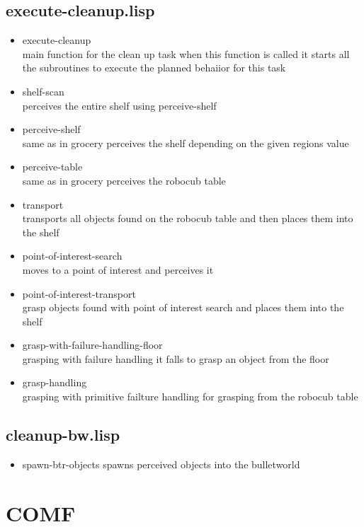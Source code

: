 \documentclass[main.tex]{subfiles}
\begin{document}
	  	\subsection{execute-cleanup.lisp}
	  	\begin{itemize}
			\item execute-cleanup \\
			main function for the clean up task when this function is called it starts all the subroutines to execute the planned behaiior for this task
			\item shelf-scan \\
			perceives the entire shelf using perceive-shelf
			\item perceive-shelf\\
			same as in grocery perceives the shelf depending on the given regions value
			\item perceive-table \\
			same as in grocery perceives the robocub table
			\item transport \\
            transports all objects found on the robocub table and then places them into the shelf
			\item point-of-interest-search \\
			moves to a point of interest and perceives it 
			\item point-of-interest-transport \\
			grasp objects found with point of interest search and places them into the shelf
			\item grasp-with-failure-handling-floor \\
			grasping with failure handling it falls to grasp an object from the floor
			\item grasp-handling\\
			grasping with primitive failture handling for grasping from the robocub table
		\end{itemize}

	    \subsection{cleanup-bw.lisp}
		\begin{itemize}
			\item spawn-btr-objects
			spawns perceived objects into the bulletworld
		\end{itemize}
	  	
	  	\section{COMF}
\end{document}
